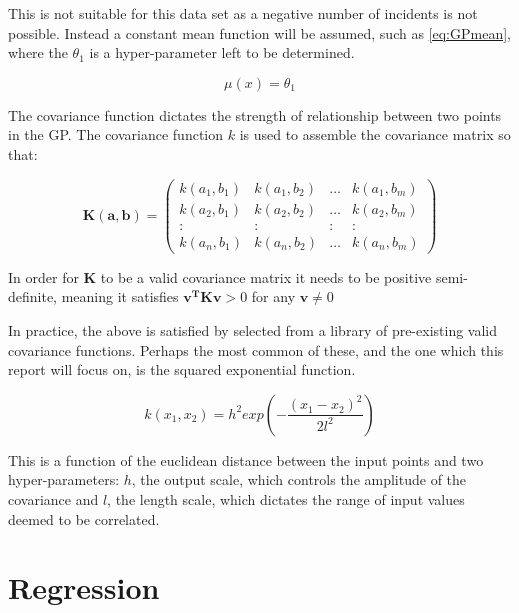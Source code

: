 \documentclass[a4paper,11pt]{report}
\begin{document}
This is not suitable for this data set as a negative number of incidents is not possible. Instead a constant mean function will be assumed, such as \ref{eq:GPmean}, where the \(\theta_1\) is a hyper-parameter left to be determined.

\begin{equation} \label{eq:GPmean}
\mu (x) = \theta_1
\end{equation}

\par

The covariance function dictates the strength of relationship between two points in the GP. The covariance function \(k\) is used to assemble the covariance matrix so that: 

\begin{equation}
\mathbf{K(a,b)} =  \left( \begin{array}{cccc}
k(a_1,b_1) & k(a_1,b_2) &  \dots & k(a_1,b_m) \\
k(a_2,b_1) & k(a_2,b_2) &  \dots & k(a_2,b_m) \\
: & : & : & : \\
k(a_n,b_1) & k(a_n,b_2) &  \dots & k(a_n,b_m)  \end{array} \right) 
\end{equation}

In order for \textbf{K} to be a valid covariance matrix it needs to be positive semi-definite, meaning it satisfies \( \mathbf{v^{T} K v} > 0\) for any \( \mathbf{v} \neq 0 \)

In practice, the above is satisfied by selected from a library of pre-existing valid covariance functions. Perhaps the most common of these, and the one which this report will focus on, is the squared exponential function.

\begin{equation}
k(x_1,x_2) = h^2 exp(- \frac{(x_1-x_2)^2}{2 l^2})
\end{equation} 

This is a function of the euclidean distance between the input points and two hyper-parameters: \(h\), the output scale, which controls the amplitude of the covariance and \(l\), the length scale, which dictates the range of input values deemed to be correlated. 

\section{Regression}
\end{document}
